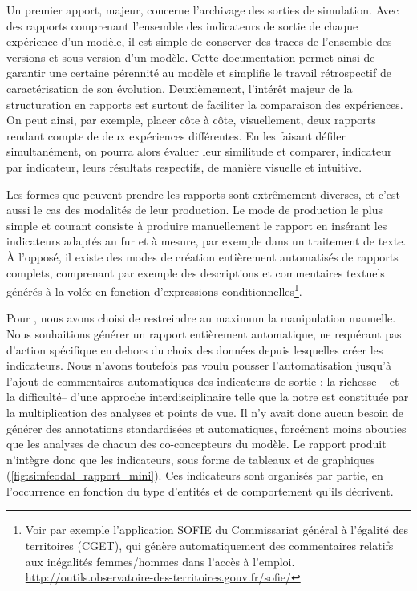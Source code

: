Un premier apport, majeur, concerne l'archivage des sorties de simulation.
Avec des rapports comprenant l'ensemble des indicateurs de sortie de chaque expérience d'un modèle, il est simple de conserver des traces de l'ensemble des versions et sous-version d'un modèle.
Cette documentation permet ainsi de garantir une certaine pérennité au modèle et simplifie le travail rétrospectif de caractérisation de son évolution.	
Deuxièmement, l'intérêt majeur de la structuration en rapports est surtout de faciliter la comparaison des expériences.
On peut ainsi, par exemple, placer côte à côte, visuellement, deux rapports rendant compte de deux expériences différentes.
En les faisant défiler simultanément, on pourra alors évaluer leur similitude et comparer, indicateur par indicateur, leurs résultats respectifs, de manière visuelle et intuitive.

Les formes que peuvent prendre les rapports sont extrêmement diverses, et c'est aussi le cas des modalités de leur production.
Le mode de production le plus simple et courant consiste à produire manuellement le rapport en insérant les indicateurs adaptés au fur et à mesure, par exemple dans un traitement de texte.
À l'opposé, il existe des modes de création entièrement automatisés de rapports complets, comprenant par exemple des descriptions et commentaires textuels générés à la volée en fonction d'expressions conditionnelles\footnote{
	Voir par exemple l'application \og SOFIE\fg{} du Commissariat général à l'égalité des territoires (CGET), qui génère automatiquement des commentaires relatifs aux inégalités femmes/hommes dans l'accès à l'emploi.
	\href{http://outils.observatoire-des-territoires.gouv.fr/sofie/}{http://outils.observatoire-des-territoires.gouv.fr/sofie/}
}.

Pour \simfeodal{}, nous avons choisi de restreindre au maximum la manipulation manuelle.
Nous souhaitions générer un rapport entièrement automatique, ne requérant pas d'action spécifique en dehors du choix des données depuis lesquelles créer les indicateurs.
Nous n'avons toutefois pas voulu pousser l'automatisation jusqu'à l'ajout de commentaires automatiques des indicateurs de sortie :
	la richesse -- et la difficulté-- d'une approche interdisciplinaire telle que la notre est constituée par la multiplication des analyses et points de vue.
Il n'y avait donc aucun besoin de générer des annotations standardisées et automatiques, forcément moins abouties que les analyses de chacun des co-concepteurs du modèle.
Le rapport produit n'intègre donc que les indicateurs, sous forme de tableaux et de graphiques (\cref{fig:simfeodal_rapport_mini}).
Ces indicateurs sont organisés par partie, en l'occurrence en fonction du type d'entités et de comportement qu'ils décrivent.


